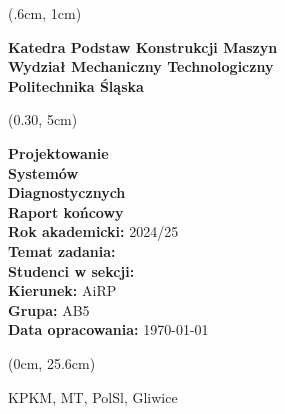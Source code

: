 
\begin{textblock*}{0.24\textwidth}(.6cm, 1cm)
    \begin{flushright}
    \large
    \textbf{
        Katedra Podstaw Konstrukcji Maszyn \\[1cm]
        Wydział Mechaniczny Technologiczny \\[1cm]
        Politechnika Śląska
    }
    \end{flushright}
\end{textblock*}

\begin{textblock*}{0.65\textwidth}(0.30\paperwidth, 5cm)
    \begin{flushleft}
        \Huge \textbf{Projektowanie \\Systemów \\ Diagnostycznych \\[1.5cm]}
        \LARGE \textbf{Raport końcowy} \\[1cm] 
        \normalsize \textbf{Rok akademicki:} 2024/25\\[.6cm]
        \textbf{Temat zadania:} \tematZadania\\[.6cm]
        \textbf{Studenci w sekcji:} \Name\\[.6cm]
        \textbf{Kierunek:} AiRP\\[.6cm]
        \textbf{Grupa:} AB5\\ [.6cm]
        \textbf{Data opracowania:} \mydate\today\\ 
    \end{flushleft}
\end{textblock*}

\begin{textblock*}{\textwidth}(0cm, 25.6cm)
    \begin{center}
        \color{gray}
        \small KPKM, MT, PolSl, Gliwice
    \end{center}
\end{textblock*}

\renewcommand{\familydefault}{\rmdefault}
\newpage